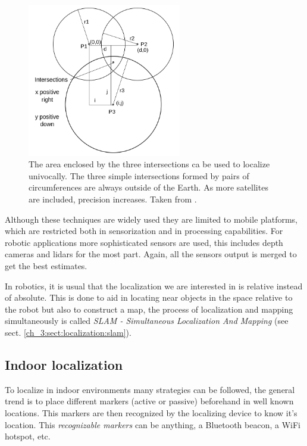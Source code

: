       \begin{figure}
        \centering
        \includegraphics[width=0.6\textwidth]{./Figures/trilateration.png}
        \caption{The area enclosed by the three intersections ca be used to localize univocally. The three simple intersections formed by pairs of circumferences are always outside of the Earth. As more satellites are included, precision increases. Taken from \cite{wikipedia_trilateration_web}.}
        \label{ch_3:fig:trilateration}
      \end{figure}

      Although these techniques are widely used they are limited to mobile platforms, which are restricted both in sensorization and in processing capabilities. For robotic applications more sophisticated sensors are used, this includes depth cameras and lidars for the most part. Again, all the sensors output is merged to get the best estimates.

      In robotics, it is usual that the localization we are interested in is relative instead of absolute. This is done to aid in locating near objects in the space relative to the robot but also to construct a map, the process of localization and mapping simultaneously is called \textit{SLAM - Simultaneous Localization And Mapping} (see sect. \ref{ch_3:sect:localization:slam}).

    \subsection{Indoor localization} \label{ch_3:sect:localization:indoor}

      To localize in indoor environments many strategies can be followed, the general trend is to place different markers (active or passive) beforehand in well known locations. This markers are then recognized by the localizing device to know it's location. This \textit{recognizable markers} can be anything, a Bluetooth beacon, a WiFi hotspot, etc.

